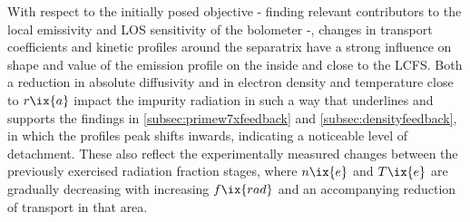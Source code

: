 %
                \newline%
                With respect to the initially posed objective - finding relevant contributors to the local emissivity and LOS sensitivity of the bolometer -, changes in transport coefficients and kinetic profiles around the separatrix have a strong influence on shape and value of the emission profile on the inside and close to the LCFS. Both a reduction in absolute diffusivity and in electron density and temperature close to $r\ix{a}$ impact the impurity radiation in such a way that underlines and supports the findings in \cref{subsec:primew7xfeedback} and \ref{subsec:densityfeedback}, in which the profiles peak shifts inwards, indicating a noticeable level of detachment. These also reflect the experimentally measured changes between the previously exercised radiation fraction stages, where $n\ix{e}$ and $T\ix{e}$ are gradually decreasing with increasing $f\ix{rad}$ and an accompanying reduction of transport in that area.%
%
